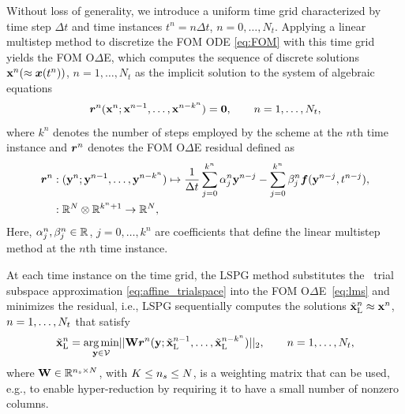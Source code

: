\documentclass[3p,computermodern,10pt]{elsarticle}
\begin{document}
Without loss of generality, we introduce a uniform time
grid characterized by time step $\Delta t$ and time instances
$t^n = n\Delta
t$, $n=0,\ldots,N_t$.
Applying a linear multistep method to discretize the FOM ODE \eqref{eq:FOM}
with this time grid
yields the FOM O$\Delta$E, which computes the sequence of discrete
solutions
${\mathbf{x}}^{n}( \approx {\boldsymbol x}(t^n))$, $n=1,\ldots,N_t$
as the implicit solution to the system of algebraic equations
\begin{equation}\label{eq:lms}
\boldsymbol r_{}^{n}
	({\mathbf{x}}^{n};{\mathbf{x}}^{n-1},\ldots,{\mathbf{x}}^{n-k^n})
	= \boldsymbol 0,\qquad n=1,\ldots,N_t,
\end{equation}
where  $k^n$ denotes the number of steps employed by the scheme at the $n$th
time instance and 
$\boldsymbol r_{}^{n}$ denotes the FOM O$\Delta$E residual defined as
\begin{align*}
\boldsymbol r_{}^{n} &: (\mathbf{y}^{n};\mathbf{y}^{n-1},\ldots,\mathbf{y}^{n-k^n}) \mapsto  \frac{1}{\Delta t} \sum_{j=0}^{k^n} \alpha^n_j \mathbf{y}^{n-j} -  \sum_{j=0}^{k^n} \beta^n_j \boldsymbol f(\mathbf{y}^{n-j},t^{n-j}),
\\
&: \mathbb{R}^{N} \otimes \mathbb{R}^{k^n + 1} \rightarrow \mathbb{R}^{N},
\end{align*} 
Here, $\alpha^n_j,\beta^n_j\in\mathbb{R}^{}$, $j=0,\ldots,k^n$ are coefficients
that define the linear multistep method at the $n$th time instance.

At each time instance on the time grid, the LSPG method substitutes the \spatialAcronym\ trial subspace approximation
\eqref{eq:affine_trialspace} into the FOM O$\Delta$E~\eqref{eq:lms} and
minimizes the residual, i.e., LSPG sequentially computes the solutions
$\tilde{\mathbf{x}}_{\text{L}}^n \approx {\mathbf{x}}^{n}$, $n=1,\ldots,
N_t$ that satisfy
\begin{equation*}
\tilde{\mathbf{x}}_{\text{L}}^n = \underset{\mathbf{y} \in \mathcal{V }  }{\text{arg\,min}}|| \mathbf{W}\boldsymbol r_{}^{n} (\mathbf{y}; \tilde{\mathbf{x}}_{\text{L}}^{n-1},\ldots,\tilde{\mathbf{x}}_{\text{L}}^{n-k^n}) ||_2, \qquad n = 1,\ldots,N_t,
\end{equation*}
where 
$\mathbf{W} \in \mathbb{R}^{n_s \times N}$, with $K
\le n_s \le N$, is a weighting matrix that can be used, e.g., to
enable hyper-reduction by requiring it to have a small number of nonzero
columns. 
\end{document}

